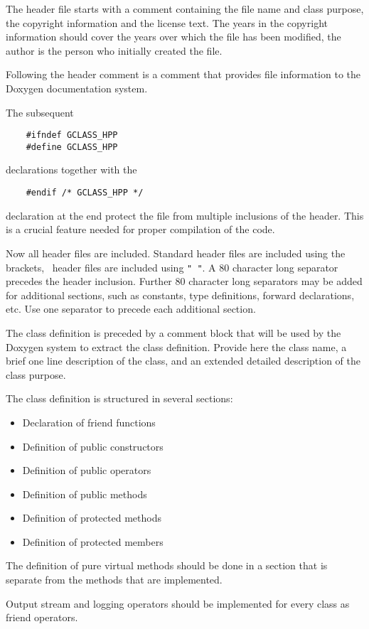 \documentclass{article}[12pt,a4]
\begin{document}
The header file starts with a comment containing the file name and class purpose, the
copyright information and the license text.
The years in the copyright information should cover the years over which the file has been
modified, the author is the person who initially created the file.

Following the header comment is a comment that provides file information to the
Doxygen documentation system.

The subsequent
\begin{verbatim}
    #ifndef GCLASS_HPP
    #define GCLASS_HPP
\end{verbatim}
declarations together with the 
\begin{verbatim}
    #endif /* GCLASS_HPP */
\end{verbatim}
declaration at the end protect the file from multiple inclusions of the header.
This is a crucial feature needed for proper compilation of the code.

Now all header files are included.
Standard header files are included using the {\tt < >} brackets, \this\ header files are included
using {\tt " "}.
A 80 character long separator precedes the header inclusion.
Further 80 character long separators may be added for additional sections, such as
constants, type definitions, forward declarations, etc.
Use one separator to precede each additional section.

The class definition is preceded by a comment block that will be used by the Doxygen system
to extract the class definition.
Provide here the class name, a brief one line description of the class, and an extended
detailed description of the class purpose.

The class definition is structured in several sections:
\begin{itemize}
\item Declaration of friend functions
\item Definition of public constructors
\item Definition of public operators
\item Definition of public methods
\item Definition of protected methods
\item Definition of protected members
\end{itemize}
The definition of pure virtual methods should be done in a section that is separate from the
methods that are implemented.

Output stream and logging operators should be implemented for every class as friend
operators.
\end{document}
